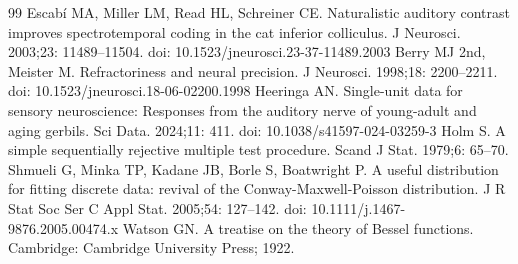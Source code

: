\begin{thebibliography}{99}
 Escabí MA, Miller LM, Read HL, Schreiner CE. Naturalistic auditory contrast improves spectrotemporal coding in the cat inferior colliculus. J Neurosci. 2003;23: 11489--11504. doi: 10.1523/jneurosci.23-37-11489.2003
 Berry MJ 2nd, Meister M. Refractoriness and neural precision. J Neurosci. 1998;18: 2200--2211. doi: 10.1523/jneurosci.18-06-02200.1998
 Heeringa AN. Single-unit data for sensory neuroscience: Responses from the auditory nerve of young-adult and aging gerbils. Sci Data. 2024;11: 411. doi: 10.1038/s41597-024-03259-3
 Holm S. A simple sequentially rejective multiple test procedure. Scand J Stat. 1979;6: 65--70.
 Shmueli G, Minka TP, Kadane JB, Borle S, Boatwright P. A useful distribution for fitting discrete data: revival of the Conway-Maxwell-Poisson distribution. J R Stat Soc Ser C Appl Stat. 2005;54: 127--142. doi: 10.1111/j.1467-9876.2005.00474.x
 Watson GN. A treatise on the theory of Bessel functions. Cambridge: Cambridge University Press; 1922.
\end{thebibliography}
